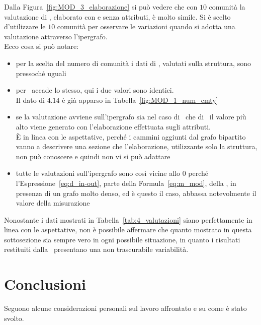 %
Dalla Figura~\ref{fig:MOD_3_elaborazione} si può vedere che con $10$ comunità la valutazione di \cora, elaborato con e senza attributi, è molto simile. Si è scelto d'utilizzare le $10$ comunità per osservare le variazioni quando si adotta una valutazione attraverso l'ipergrafo.\\
Ecco cosa si può notare:
\begin{itemize}
	\item per la scelta del numero di comunità i dati di \cora, valutati sulla struttura, sono pressoché uguali
	\item per \citeseer\ accade lo stesso, qui i due valori sono identici.\\
	Il dato di $4.14$  è già apparso in Tabella~\ref{fig:MOD_1_num_cmty}
	\item se la valutazione avviene sull'ipergrafo sia nel caso di \cora\ che di \citeseer\ il valore più alto viene generato con l'elaborazione effettuata sugli attributi.\\
	È in linea con le aspettative, perché i cammini aggiunti dal grafo bipartito vanno a descrivere una sezione che l'elaborazione, utilizzante solo la struttura, non può conoscere e quindi non vi si può adattare
	\item tutte le valutazioni sull'ipergrafo sono così vicine allo $0$ perché l'Espressione~\ref{eq:d_in-out}, parte della Formula~\ref{eq:m_mod}, della \mmod, in presenza di un grafo molto denso, ed è questo il caso, abbassa notevolmente il valore della misurazione
\end{itemize}
%
Nonostante i dati mostrati in Tabella~\ref{tab:4_valutazioni} siano perfettamente in linea con le aspettative, non è possibile affermare che quanto mostrato in questa sottosezione sia sempre vero in ogni possibile situazione, in quanto i risultati restituiti dalla \mmod\ presentano una non trascurabile variabilità.



\chapter{Conclusioni}\label{chap:4}
Seguono alcune considerazioni personali sul lavoro affrontato e su come è stato svolto.
